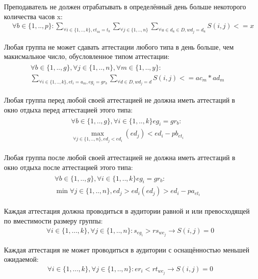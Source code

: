 Преподаватель не должен отрабатывать в определённый день больше некоторого количества часов x:
\begin{align}
	& \forall b \in \{1,..,p\} : \sum_{\forall i \in \{1,..,k\}, et_{ia}=t_b}\sum_{\forall j \in \{1,..,n\}}\sum_{ \forall u \in d_u \in D, wd_j = d_u }S(i,j) <= x
\end{align}

Любая группа не может сдавать аттестации любого типа в день больше, чем макисмальное число, обусловленное типом аттестации:
\begin{align}
\begin{multlined}
	 \forall b \in \{1,..,g\}, \forall j \in \{1,..,n\}, \forall m \in \{1,..,y\} :\\ \sum_{\forall i \in \{1,..,k\}, et_i = a_m,  eg_i=gr_b}\sum_{ \forall d \in D, wd_j = d }S(i,j) <= ac_m * ad_m
\end{multlined}
\end{align}

Любая группа перед любой своей аттестацией не должна иметь аттестаций в окно отдыха перед аттестацией этого типа:
\begin{align}
	\begin{multlined}
		\forall b \in \{1,..,g\}, \forall i \in \{1,..,k\} eg_i=gr_b:\\
		 \max_{\forall j \in \{1,..,n\}, ed_j < ed_i}(ed_j) <ed_i-pb_{et_i}
	\end{multlined}
\end{align}

Любая группа после любой своей аттестацией не должна иметь аттестаций в окно отдыха после аттестацией этого типа:
\begin{align}
	\begin{multlined}
		\forall b \in \{1,..,g\}, \forall i \in \{1,..,k\} eg_i=gr_b:\\
		\min{\forall j \in \{1,..,n\}, ed_j > ed_i}(ed_j) >ed_i-pa_{et_i}
	\end{multlined}
\end{align}

Каждая аттестация должна проводиться в аудитории равной и или превосходящей по вместимости размеру группы:
\begin{align}
	& \forall i \in \{1,...,k\}, \forall j \in \{1,..,n\} : s_{eg_i} > rs_{wc_j} \rightarrow S(i,j) = 0
\end{align}

Каждая аттестация не может проводиться в аудитории с оснащённостью меньшей ожидаемой:
\begin{align}
	& \forall i \in \{1,...,k\}, \forall j \in \{1,..,n\} : er_i < rt_{wc_j} \rightarrow S(i,j) = 0
\end{align}

